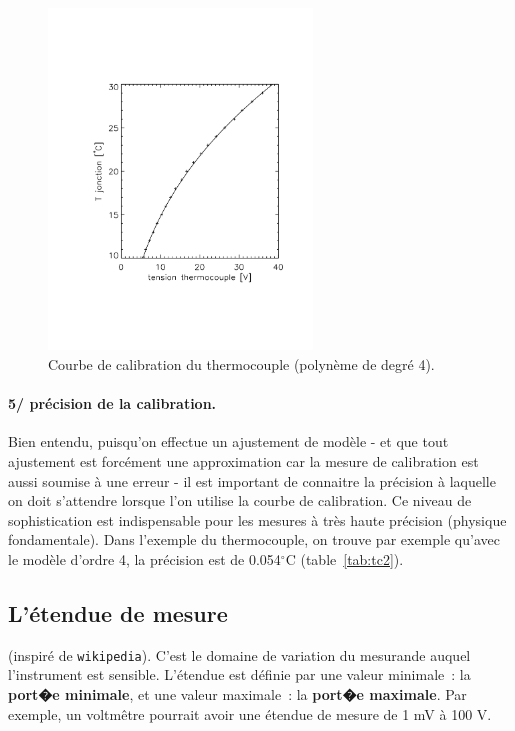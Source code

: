 \begin{figure}
\vspace{-0mm}
   \centering
   \includegraphics[width=7cm]{assets/figures/calibThermoCouple.pdf}
   \caption{Courbe de calibration du thermocouple (polynème de degré 4).}
   \label{fig:tc}
\end{figure}
\paragraph{5/ précision de la calibration.} Bien entendu, puisqu'on effectue un ajustement de modèle - et que tout ajustement est forcément une approximation car la mesure de calibration est aussi soumise à une erreur - il est important de connaitre la précision à laquelle on doit s'attendre lorsque l'on utilise la courbe de calibration. Ce niveau de sophistication est indispensable pour les mesures à très haute précision (physique fondamentale). Dans l'exemple du thermocouple, on trouve par exemple qu'avec le modèle d'ordre 4, la précision est de 0.054$^\circ$C (table~\ref{tab:tc2}).

\subsection{L'étendue de mesure}\label{sec:etd}

(inspiré de \texttt{wikipedia}). C'est le domaine de variation du mesurande auquel l'instrument est sensible. L'étendue est définie par une valeur minimale~: la \textbf{port�e minimale}, et une valeur maximale~: la \textbf{port�e maximale}. Par exemple, un voltmêtre pourrait avoir une étendue de mesure de 1 mV à 100 V.

